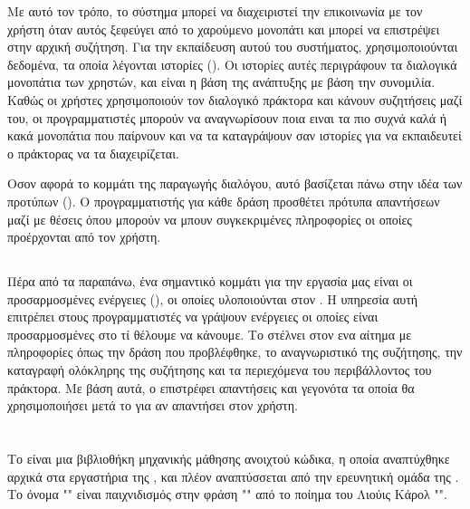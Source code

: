 Με αυτό τον τρόπο, το σύστημα μπορεί να διαχειριστεί την επικοινωνία με τον χρήστη όταν αυτός ξεφεύγει από το χαρούμενο μονοπάτι και μπορεί να επιστρέψει στην αρχική συζήτηση. Για την εκπαίδευση αυτού του συστήματος, χρησιμοποιούνται δεδομένα, τα οποία λέγονται ιστορίες (). Οι ιστορίες αυτές περιγράφουν τα διαλογικά μονοπάτια των χρηστών, και είναι η βάση της ανάπτυξης με βάση την συνομιλία. Καθώς οι χρήστες χρησιμοποιούν τον διαλογικό πράκτορα και κάνουν συζητήσεις μαζί του, οι προγραμματιστές μπορούν να αναγνωρίσουν ποια ειναι τα πιο συχνά καλά ή κακά μονοπάτια που παίρνουν και να τα καταγράψουν σαν ιστορίες για να εκπαιδευτεί ο πράκτορας να τα διαχειρίζεται.

Οσον αφορά το κομμάτι της παραγωγής διαλόγου, αυτό βασίζεται πάνω στην ιδέα των προτύπων (). Ο προγραμματιστής για κάθε δράση προσθέτει πρότυπα απαντήσεων μαζί με θέσεις όπου μπορούν να μπουν συγκεκριμένες πληροφορίες οι οποίες προέρχονται από τον χρήστη.

\subsection{}

Πέρα από τα παραπάνω, ένα σημαντικό κομμάτι για την εργασία μας είναι οι προσαρμοσμένες ενέργειες (), οι οποίες υλοποιούνται στον . Η υπηρεσία αυτή επιτρέπει στους προγραμματιστές να γράψουν ενέργειες οι οποίες είναι προσαρμοσμένες στο τί θέλουμε να κάνουμε. Το  στέλνει στον  ενα αίτημα με πληροφορίες όπως την δράση που προβλέφθηκε, το αναγνωριστικό της συζήτησης, την καταγραφή ολόκληρης της συζήτησης και τα περιεχόμενα του περιβάλλοντος του πράκτορα. Με βάση αυτά, ο  επιστρέφει απαντήσεις και γεγονότα τα οποία θα χρησιμοποιήσει μετά το  για αν απαντήσει στον χρήστη.

\section{}

Το \cite{agarwal2013reliable} είναι μια βιβλιοθήκη μηχανικής μάθησης ανοιχτού κώδικα, η οποία αναπτύχθηκε αρχικά στα εργαστήρια της , και πλέον αναπτύσσεται από την ερευνητική ομάδα της . Το όνομα "" είναι παιχνιδισμός στην φράση  "" από το ποίημα του Λιούις Κάρολ "".

